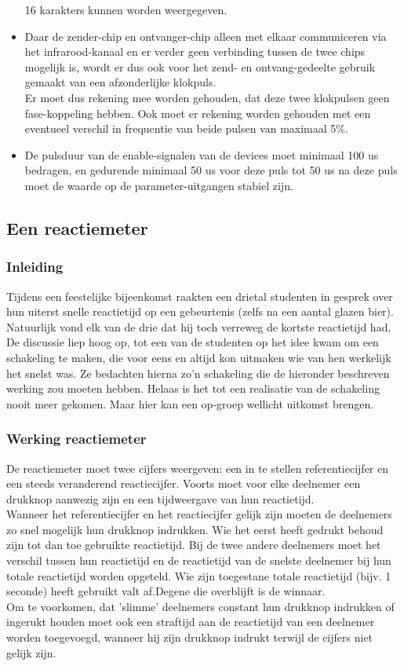 \begin{itemize}
      16 karakters kunnen worden weergegeven.
\item Daar de zender-chip en ontvanger-chip alleen met elkaar communiceren
      via het infrarood-kanaal en er verder geen verbinding tussen de twee
      chips mogelijk is, wordt er dus ook voor het zend- en ontvang-gedeelte
      gebruik gemaakt van een afzonderlijke klokpuls.\\
      Er moet dus rekening mee worden gehouden, dat deze twee klokpulsen
      geen fase-koppeling hebben.
      Ook moet er rekening worden gehouden met een eventueel verschil in
      frequentie van beide pulsen van maximaal 5\%.
\item De pulsduur van de enable-signalen van de devices moet minimaal 100 us
      bedragen, en gedurende minimaal 50 us voor deze puls tot 50 us
      na deze puls moet de waarde op de parameter-uitgangen stabiel zijn.
\end{itemize}

\subsection{Een reactiemeter}
\subsubsection{Inleiding}
Tijdens een feestelijke bijeenkomst raakten een drietal studenten in gesprek
over hun uiterst snelle reactietijd op een gebeurtenis (zelfs na een aantal
glazen bier).
Natuurlijk vond elk van de drie dat hij toch verreweg de kortste reactietijd 
had.
De discussie liep hoog op, tot een van de studenten op het idee kwam om een 
schakeling te maken, die voor eens en altijd kon uitmaken wie van hen werkelijk het snelst was.
Ze bedachten hierna zo'n schakeling die de hieronder beschreven werking
zou moeten hebben.
Helaas is het tot een realisatie van de schakeling nooit meer gekomen.
Maar hier kan een op-groep wellicht uitkomst brengen.

\subsubsection{Werking reactiemeter}
De reactiemeter moet twee cijfers weergeven: een in te stellen referentiecijfer
en een steeds veranderend reactiecijfer.
Voorts moet voor elke deelnemer een drukknop aanwezig zijn en een 
tijdweergave van hun reactietijd.\\
Wanneer het referentiecijfer en het reactiecijfer gelijk zijn moeten de
deelnemers zo snel mogelijk hun drukknop indrukken.
Wie het eerst heeft gedrukt behoud zijn tot dan toe gebruikte reactietijd.
Bij de twee andere deelnemers moet het verschil tussen hun reactietijd en de
reactietijd van de snelste deelnemer bij hun totale reactietijd worden
opgeteld.
Wie zijn toegestane totale reactietijd (bijv. 1 seconde) heeft gebruikt valt af.Degene die overblijft is de winnaar.\\
Om te voorkomen, dat 'slimme' deelnemers constant hun drukknop indrukken of
ingerukt houden moet ook een straftijd aan de reactietijd van een deelnemer
worden toegevoegd, wanneer hij zijn drukknop indrukt terwijl de cijfers
niet gelijk zijn.

